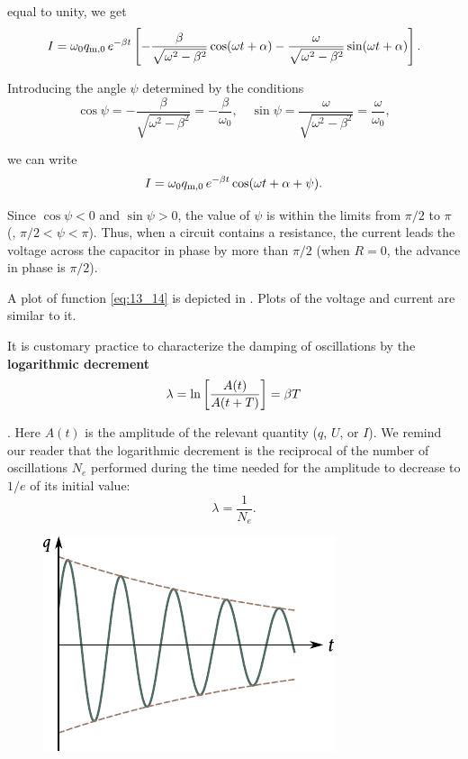 \noindent
equal to unity, we get
\begin{equation*}
    I = \omega_0 q_{\text{m,$0$}}\, e^{-\beta t} \left[ - \frac{\beta}{\sqrt{\omega^2-\beta^2}} \cos(\omega t + \alpha) - \frac{\omega}{\sqrt{\omega^2-\beta^2}} \sin(\omega t + \alpha) \right].
\end{equation*}

Introducing the angle $\psi$ determined by the conditions
\begin{equation*}
    \cos\psi = - \frac{\beta}{\sqrt{\omega^2-\beta^2}} = - \frac{\beta}{\omega_0},\quad \sin\psi = \frac{\omega}{\sqrt{\omega^2-\beta^2}} = \frac{\omega}{\omega_0},
\end{equation*}

\noindent
we can write
\begin{equation}\label{eq:13_17}
    I = \omega_0 q_{\text{m,$0$}}\, e^{-\beta t} \cos(\omega t + \alpha + \psi).
\end{equation}

\noindent
Since $\cos\psi<0$ and $\sin\psi>0$, the value of $\psi$ is within the limits from $\pi/2$ to $\pi$ (\ie, $\pi/2<\psi<\pi$).
Thus, when a circuit contains a resistance, the current leads the voltage across the capacitor in phase by more than $\pi/2$ (when $R=0$, the advance in phase is $\pi/2$).

A plot of function \eqref{eq:13_14} is depicted in .
Plots of the voltage and current are similar to it.

It is customary practice to characterize the damping of oscillations by the \textbf{logarithmic decrement}
\begin{equation}\label{eq:13_18}
    \lambda = \ln\left[ \frac{A(t)}{A(t+T)} \right] = \beta T
\end{equation}

.
Here $A(t)$ is the amplitude of the relevant quantity ($q$, $U$, or $I$).
We remind our reader that the logarithmic decrement is the reciprocal of the number of oscillations $N_e$ performed during the time needed for the amplitude to decrease to $1/e$ of its initial value:
\begin{equation*}
    \lambda = \frac{1}{N_e}.
\end{equation*}

\begin{figure}[t]
	\begin{center}
		\includegraphics[scale=1]{figures/ch_13/fig_13_4.pdf}
		\caption[]{}
		\label{fig:13_4}
	\end{center}
	\vspace{-0.8cm}
\end{figure}

